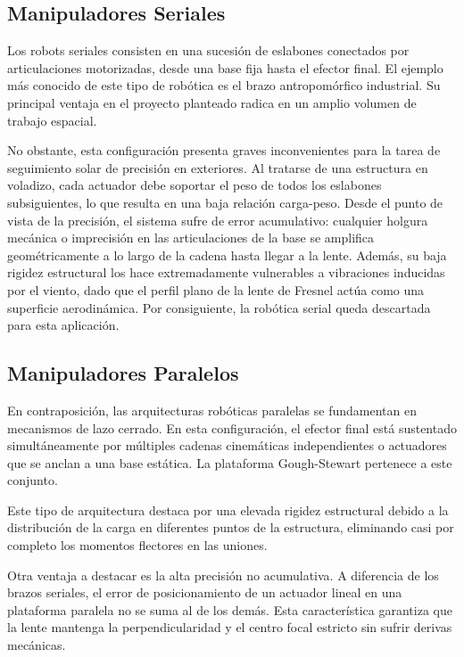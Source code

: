 \subsection{Manipuladores Seriales}
Los robots seriales consisten en una sucesión de eslabones conectados por articulaciones motorizadas, desde una base fija hasta el efector final. El ejemplo más conocido de este tipo de robótica es el brazo antropomórfico industrial. Su principal ventaja en el proyecto planteado radica en un amplio volumen de trabajo espacial.

No obstante, esta configuración presenta graves inconvenientes para la tarea de seguimiento solar de precisión en exteriores. Al tratarse de una estructura en voladizo, cada actuador debe soportar el peso de todos los eslabones subsiguientes, lo que resulta en una baja relación carga-peso. Desde el punto de vista de la precisión, el sistema sufre de error acumulativo: cualquier holgura mecánica o imprecisión en las articulaciones de la base se amplifica geométricamente a lo largo de la cadena hasta llegar a la lente. Además, su baja rigidez estructural los hace extremadamente vulnerables a vibraciones inducidas por el viento, dado que el perfil plano de la lente de Fresnel actúa como una superficie aerodinámica. Por consiguiente, la robótica serial queda descartada para esta aplicación.

\subsection{Manipuladores Paralelos}
En contraposición, las arquitecturas robóticas paralelas se fundamentan en mecanismos de lazo cerrado. En esta configuración, el efector final está sustentado simultáneamente por múltiples cadenas cinemáticas independientes o actuadores que se anclan a una base estática. La plataforma Gough-Stewart pertenece a este conjunto.

Este tipo de arquitectura destaca por una elevada rigidez estructural debido a la distribución de la carga en diferentes puntos de la estructura, eliminando casi por completo los momentos flectores en las uniones. 

Otra ventaja a destacar es la alta precisión no acumulativa. A diferencia de los brazos seriales, el error de posicionamiento de un actuador lineal en una plataforma paralela no se suma al de los demás. Esta característica garantiza que la lente mantenga la perpendicularidad y el centro focal estricto sin sufrir derivas mecánicas.


